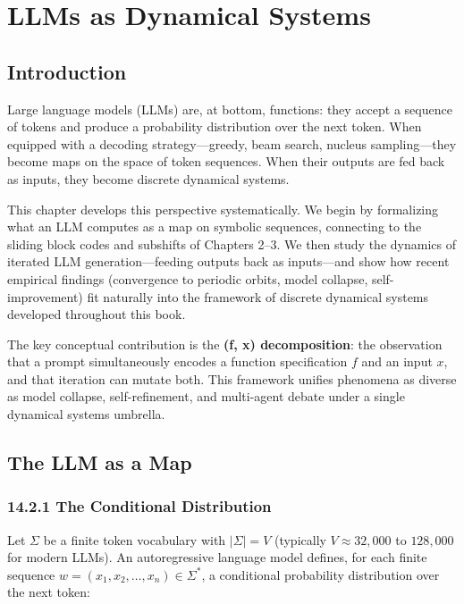 \chapter{LLMs as Dynamical Systems}

\section{Introduction}

Large language models (LLMs) are, at bottom, functions: they accept a sequence of tokens and produce a probability distribution over the next token. When equipped with a decoding strategy---greedy, beam search, nucleus sampling---they become maps on the space of token sequences. When their outputs are fed back as inputs, they become discrete dynamical systems.

This chapter develops this perspective systematically. We begin by formalizing what an LLM computes as a map on symbolic sequences, connecting to the sliding block codes and subshifts of Chapters 2--3. We then study the dynamics of iterated LLM generation---feeding outputs back as inputs---and show how recent empirical findings (convergence to periodic orbits, model collapse, self-improvement) fit naturally into the framework of discrete dynamical systems developed throughout this book.

The key conceptual contribution is the \textbf{(f, x) decomposition}: the observation that a prompt simultaneously encodes a function specification $f$ and an input $x$, and that iteration can mutate both. This framework unifies phenomena as diverse as model collapse, self-refinement, and multi-agent debate under a single dynamical systems umbrella.



\section{The LLM as a Map}

\subsection{14.2.1 The Conditional Distribution}

Let $\Sigma$ be a finite token vocabulary with $|\Sigma| = V$ (typically $V \approx 32{,}000$ to $128{,}000$ for modern LLMs). An autoregressive language model defines, for each finite sequence $w = (x_1, x_2, \ldots, x_n) \in \Sigma^*$, a conditional probability distribution over the next token:

